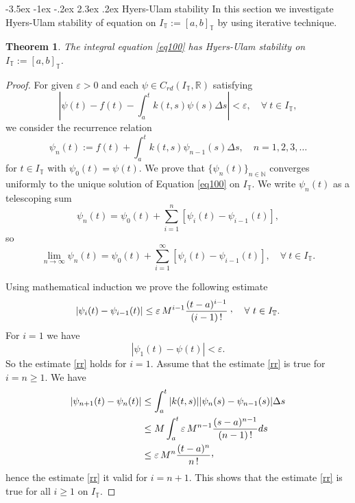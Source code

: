 \documentclass{article}
\makeatletter
\renewcommand\section{\@startsection {section}{1}{\z@}%
                                   {-3.5ex \@plus -1ex \@minus -.2ex}%
                                   {2.3ex \@plus.2ex}%
                                   {\normalfont\Large\bfseries
                                    \setcounter{equation}{0}
                                    \setcounter{thm}{0}}}
\newtheorem{thm}{Theorem}
\newcommand{\q}{\quad}
\newcommand{\CommaBin}{\mathbin{\raisebox{0.5ex}{,}}}
\makeatother
\begin{document}
\section{Hyers-Ulam stability}
In this section we investigate Hyers-Ulam stability of equation on $I_\mathbb{T}:=[a,b]_\mathbb{T}$ by using iterative technique.
\begin{thm}\label{hyers}
The integral equation \eqref{eq100} has Hyers-Ulam stability on $I_\mathbb{T}:=[a,b]_\mathbb{T}$.
\end{thm}
\begin{proof}
For given $\varepsilon>0$ and each $\psi\in C_{rd}(I_\mathbb{T}, \mathbb{R})$ satisfying
$$|\psi(t)-f(t)-\int_a^tk(t,s)\psi(s)\Delta s|<\varepsilon, \q \forall \ t \in I_\mathbb{T},$$
we consider the recurrence relation
\begin{equation}\label{rec}
\psi_{n}(t):=f(t)+\int_a^tk(t,s)\psi_{n-1}(s)\Delta s, \q n=1,2,3,\ldots
\end{equation}
for $t\in I_\mathbb{T}$ with $\psi_0(t)=\psi(t)$. We prove that $\{\psi_{n}(t)\}_{n\in\mathbb{N}}$ converges uniformly to the unique solution of Equation \eqref{eq100} on $I_\mathbb{T}$. We write $\psi_{n}(t)$ as a telescoping sum
$$
\psi_n(t) = \psi _0(t)+\sum_{i=1}^{n} [\psi_{i}(t)-\psi_{i-1}(t)],
$$
 so
\begin{equation}\label{eq6}
 \lim_{n\rightarrow\infty}\psi_n(t) = \psi _0(t)+\sum_{i=1}^{\infty} [\psi_{i}(t)-\psi_{i-1}(t)], \q \forall\ t\in I_\mathbb{T}.
\end{equation}

Using mathematical induction we prove the following estimate
\begin{equation}\label{rr}
|\psi_{i}(t)-\psi_{i-1}(t)|\leq \varepsilon\,M^{i-1}\frac{(t-a)^{i-1}}{(i-1)\,!}\CommaBin \q \forall \ t\in I_\mathbb{T}.
\end{equation}
For $i=1$ we have
$$|\psi_1(t)-\psi(t)|<\varepsilon.$$
So the estimate \eqref{rr} holds for $i=1$. Assume that the estimate \eqref{rr} is true for $i=n\geq1$. We have
\begin{align*}
|\psi_{n+1}(t)-\psi_{n}(t)| & \leq\int_a^t|k(t,s)||\psi_{n}(s)-\psi_{n-1}(s)|\Delta s \\
&\leq M  \int_a^t\varepsilon\,M^{n-1}\frac{(s-a)^{n-1}}{(n-1)\,!}ds\\
&\leq \varepsilon\,M^{n}\frac{(t-a)^{n}}{n\,!}\CommaBin
\end{align*}
hence the estimate \eqref{rr} it valid for $i=n+1$. This shows that the estimate \eqref{rr} is true for all $i\geq1$ on $I_\mathbb{T}$.


\end{proof}
\end{document}
